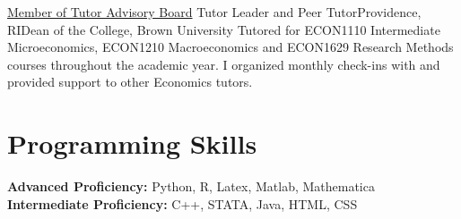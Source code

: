\documentclass[10pt,a4paper,roman]{moderncv}        %
\begin{document}
{\color{blue}\href{https://www.brown.edu/sheridan/programs-services/tutoring/staff}{Member
    of Tutor Advisory Board}\color{black}}
{Tutor Leader and Peer Tutor}{Providence, RI}{Dean of the College, Brown
  University}
{Tutored for ECON1110 Intermediate Microeconomics,
  ECON1210 Macroeconomics
  and ECON1629 Research Methods courses throughout the academic year.
  I organized monthly check-ins with and provided support to other Economics tutors.}


\section{Programming Skills}
\textbf{Advanced Proficiency: } Python, R, Latex, Matlab, Mathematica\\
\textbf{Intermediate Proficiency: } C++, STATA, Java, HTML, CSS
\end{document}
